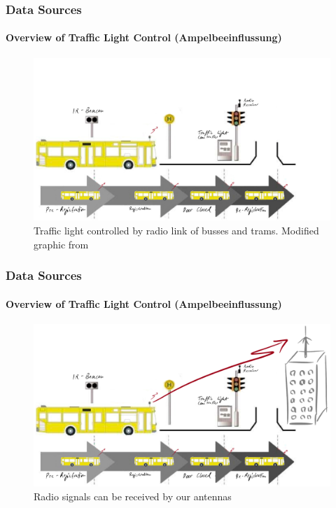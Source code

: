 
\begin{frame}
\frametitle{Data Sources}
\framesubtitle{Overview of Traffic Light Control (Ampelbeeinflussung)}
\begin{figure}
\centering
\includegraphics[height=0.65\textheight]{figs/lsa-beeinflussungs-stecke.pdf}
\caption{Traffic light controlled by radio link of busses and trams. Modified graphic from }
\end{figure}
\end{frame}


\begin{frame}
\frametitle{Data Sources}
\framesubtitle{Overview of Traffic Light Control (Ampelbeeinflussung)}
\begin{figure}
\centering
\includegraphics[height=0.65\textheight]{figs/lsa-beeinflussungs-stecke-mit-antenne.pdf}
\caption{Radio signals can be received by our antennas}
\end{figure}
\end{frame}

